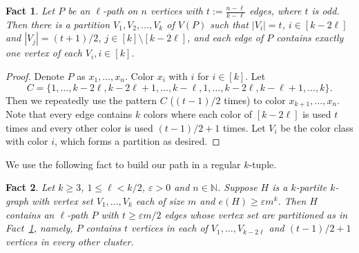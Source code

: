 \documentclass[11pt, reqno]{amsart}    	%
\newtheorem{fact}{Fact}
\theoremstyle{definition}
\numberwithin{equation}{section}
\begin{document}
	\begin{fact}\label{f1}
		Let $ P $ be an $\ell$-path on $ n $ vertices with $t := \frac{n-\ell}{k-\ell} $ edges, where $ t $ is odd. Then there is a partition $ V_1, V_2, \dots, V_k $ of $V(P) $  such that $ |V_i|=t$, $i\in[k-2\ell] $  and  $ |V_j|=(t+1)/2$, $j\in[k]\setminus[k-2\ell]  $, and each edge of $ P $ contains exactly one vertex of each $ V_i, i\in[k] $.
	\end{fact}
	\begin{proof}
		Denote $P$ as $ x_1,\dots,x_n $.
		Color $ x_i $ with $ i $ for $ i\in [k]$. Let  
		\[C= \{1,\dots,k-2\ell,k-2\ell+1,\dots,k-\ell,1,\dots,k-2\ell,k-\ell+1,\dots, k \}.\] Then we repeatedly use the pattern $ C $ ($(t-1)/2$ times) to color $ x_{k+1},\dots,x_{n} $. Note that every edge contains $ k $ colors where each  color of $ [k-2\ell] $ is used $ t$ times and every other color is used $ (t-1)/2+1$ times. Let $ V_i$ be the color class with color $i$, which forms a partition as desired.
	\end{proof} 
	
	We use the following fact to build our path in a regular $k$-tuple.
	
	\begin{fact}\label{f222}
		Let $k\ge 3$, $1\le \ell<k/2$, $\varepsilon>0$ and $n\in \mathbb N$.
		Suppose $H$ is a $k$-partite $k$-graph with vertex set $V_1, \dots, V_k$ each of size $m$ and $e(H)\ge \varepsilon m^k$.
		Then $H$ contains an $\ell$-path $P$ with  $t\ge \varepsilon m/2$ edges whose vertex set are partitioned as in Fact~\ref{f1}, namely, $P$ contains $t$ vertices in each of $V_1,\dots, V_{k-2\ell}$ and $ (t-1)/2+1$ vertices in every other cluster.
	\end{fact}
	
\end{document}
